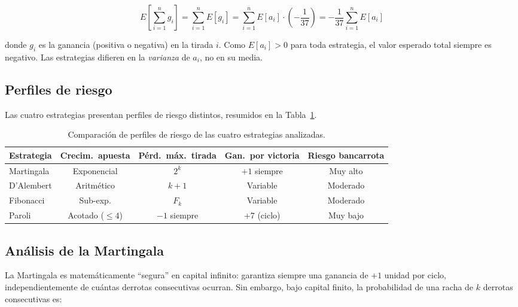 \documentclass[a4paper, 11pt]{article}
\begin{document}
\begin{equation}
  E\!\left[\sum_{i=1}^{n} g_i\right]
    = \sum_{i=1}^{n} E[g_i]
    = \sum_{i=1}^{n} E[a_i] \cdot \left(-\frac{1}{37}\right)
    = -\frac{1}{37} \sum_{i=1}^{n} E[a_i]
  \label{eq:ev_invarianza}
\end{equation}

donde $g_i$ es la ganancia (positiva o negativa) en la tirada $i$.
Como $E[a_i] > 0$ para toda estrategia, el valor esperado total siempre
es negativo. Las estrategias difieren en la \textit{varianza} de $a_i$,
no en su media.

\subsection{Perfiles de riesgo}

Las cuatro estrategias presentan perfiles de riesgo distintos, resumidos
en la Tabla~\ref{tab:riesgo}.

\begin{table}[H]
  \centering
  \caption{Comparación de perfiles de riesgo de las cuatro estrategias
    analizadas.}
  \label{tab:riesgo}
  \begin{tabular}{lcccc}
    \toprule
    \textbf{Estrategia} & \textbf{Crecim.\ apuesta}
      & \textbf{Pérd.\ máx.\ tirada}
      & \textbf{Gan.\ por victoria}
      & \textbf{Riesgo bancarrota} \\
    \midrule
    Martingala   & Exponencial & $2^k$ & $+1$ siempre & Muy alto \\
    D'Alembert   & Aritmético  & $k+1$ & Variable     & Moderado \\
    Fibonacci    & Sub-exp.    & $F_k$ & Variable     & Moderado \\
    Paroli       & Acotado ($\leq 4$) & $-1$ siempre & $+7$ (ciclo) & Muy bajo \\
    \bottomrule
  \end{tabular}
\end{table}

\subsection{Análisis de la Martingala}

La Martingala es matemáticamente ``segura'' en capital infinito: garantiza
siempre una ganancia de $+1$ unidad por ciclo, independientemente de cuántas
derrotas consecutivas ocurran. Sin embargo, bajo capital finito, la
probabilidad de una racha de $k$ derrotas consecutivas es:
\end{document}
